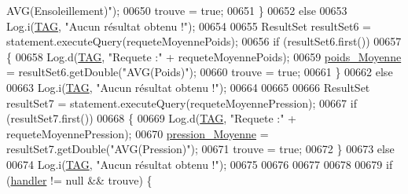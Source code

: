 \begin{DoxyCode}
{      AVG(Ensoleillement)"});
00650                             trouve = \textcolor{keyword}{true};
00651                         \}
00652                         \textcolor{keywordflow}{else}
00653                             Log.i(\hyperlink{classfr_1_1campus_1_1laurainc_1_1honeybee_1_1_ruche_a44739cbb0fa7451c1edc240a3f51c257}{TAG}, \textcolor{stringliteral}{"Aucun résultat obtenu !"});
00654 
00655                         ResultSet resultSet6 = statement.executeQuery(requeteMoyennePoids);
00656                         \textcolor{keywordflow}{if} (resultSet6.first())
00657                         \{
00658                             Log.d(\hyperlink{classfr_1_1campus_1_1laurainc_1_1honeybee_1_1_ruche_a44739cbb0fa7451c1edc240a3f51c257}{TAG}, \textcolor{stringliteral}{"Requete :"} + requeteMoyennePoids);
00659                             \hyperlink{classfr_1_1campus_1_1laurainc_1_1honeybee_1_1_ruche_a972036ada9b7e6b927d354c37351a41b}{poids\_Moyenne} = resultSet6.getDouble(\textcolor{stringliteral}{"AVG(Poids)"});
00660                             trouve = \textcolor{keyword}{true};
00661                         \}
00662                         \textcolor{keywordflow}{else}
00663                             Log.i(\hyperlink{classfr_1_1campus_1_1laurainc_1_1honeybee_1_1_ruche_a44739cbb0fa7451c1edc240a3f51c257}{TAG}, \textcolor{stringliteral}{"Aucun résultat obtenu !"});
00664 
00665 
00666                         ResultSet resultSet7 = statement.executeQuery(requeteMoyennePression);
00667                         \textcolor{keywordflow}{if} (resultSet7.first())
00668                         \{
00669                             Log.d(\hyperlink{classfr_1_1campus_1_1laurainc_1_1honeybee_1_1_ruche_a44739cbb0fa7451c1edc240a3f51c257}{TAG}, \textcolor{stringliteral}{"Requete :"} + requeteMoyennePression);
00670                             \hyperlink{classfr_1_1campus_1_1laurainc_1_1honeybee_1_1_ruche_afcfb5de514add7b23ac40ecf0913ba0f}{pression\_Moyenne} = resultSet7.getDouble(\textcolor{stringliteral}{"AVG(Pression)"});
00671                             trouve = \textcolor{keyword}{true};
00672                         \}
00673                         \textcolor{keywordflow}{else}
00674                             Log.i(\hyperlink{classfr_1_1campus_1_1laurainc_1_1honeybee_1_1_ruche_a44739cbb0fa7451c1edc240a3f51c257}{TAG}, \textcolor{stringliteral}{"Aucun résultat obtenu !"});
00675 
00676 
00677 
00678 
00679                         \textcolor{keywordflow}{if} (\hyperlink{classfr_1_1campus_1_1laurainc_1_1honeybee_1_1_ruche_a9689ca454694434549e5fffca876ffae}{handler} != null && trouve) \{

\end{DoxyCode}
